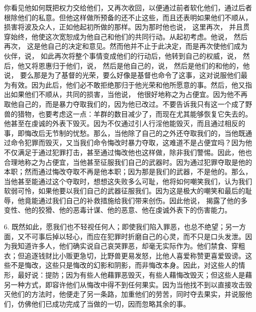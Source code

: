 \par

你看见他如何既把权力交给他们，又再次收回，以便通过前者软化他们，通过后者根除他们的私意。但他这样做所预备的还不止这些，而且还表明如果他们不顺从，损害将波及众人，正如他起初所做的那样。因为那时他也说，  这里再次， 并且贯穿始终，他使这次宽恕成为他自己和他们的共同行动。从起初考虑。他说， 然后再次， 这是他自己的决定和意见。然而他并不止于此决定，而是再次使他们成为伙伴，说，  如此再次将整个事情变成他们的行动后，他转到自己的权威，说， 然后，他又将恩惠归于他们，说， 然后是他自己的，说， 然后是他们的和他的，他说， 要么那是为了基督的光荣，要么好像是基督也命令了这事，这对说服他们最为有效。因为此后，他们必不敢拒绝那归于他光荣和他所愿意的事。然后，他又指出如果他们不顺从，共同的损害，当他说， 他很好地称之为占便宜。因为他不再取他自己的，而是暴力夺取我们的，因为他已改过。不要告诉我只有这一个成了野兽的猎物，也要考虑这一点：羊群的数目减少了，而现在尤其能够恢复它失去的。 他甚至在虔诚的外表下毁灭。因为不仅通过引人行淫他能毁灭，而且通过相反的事，即悔改后无节制的忧愁。那么，当他除了自己的之外还夺取我们的，当他既通过命令犯罪而毁灭，又当我们命令悔改时暴力夺取，这难道不是占便宜吗？因为他不仅满足于通过犯罪打击，甚至通过悔改他也这样做，除非我们警惕。因此，他也合理地称之为占便宜，当他甚至征服我们自己的武器时。因为通过犯罪夺取是他的本职；然而通过悔改夺取不再是他本职；因为那是我们的武器，不是他的。那么，当他甚至能通过这个夺取时，想想这失败多么可耻，他将如何嘲笑我们，认为我们软弱可怜，如果他要以我们自己的武器征服我们。因为这是极大的嘲笑和最后的耻辱，他竟能通过我们自己的补救措施给我们带来创伤。因此他说， 揭露了他的多变性、他的狡猾、他的恶毒计谋、他的恶意、他在虔诚外表下的伤害能力。\par

6. 既然如此，愿我们也不轻视任何人；即使我们陷入罪恶，也总不绝望；另一方面，又不可事后掉以轻心，而应在犯罪时折磨自己的心灵，而不只是口头发泄。因为我知道许多人，他们确实说自己哀哭罪恶，却毫无实际作为。他们禁食、穿粗衣；但追逐钱财比小贩更急切，比野兽更易发怒，比他人喜爱称赞更喜爱毁谤。这些不是悔改，这些只是悔改的幻影和阴影，而非悔改本身。因此，对这些人的情形，最好说：提防；因为有些人他藉罪恶毁灭，有些人藉悔改毁灭；但这些人是藉另一种方式，即容许他们从悔改中得不到任何果实。因为当他找不到以直接攻击毁灭他们的方法时，他便走了另一条路，加重他们的劳苦，同时夺去果实，并说服他们，仿佛他们已成功完成了当做的一切，因而忽略其余的事。\par

